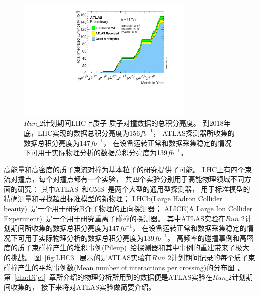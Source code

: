 \begin{figure}
  \begin{center}
    \includegraphics[width=0.75\textwidth]{figuresEXP/LHC2.pdf}
  \end{center}
  \caption{
  $Run\_2$计划期间LHC上质子-质子对撞数据的总积分亮度。
  到2018年底，LHC实现的数据总积分亮度为156$fb^{-1}$，
  ATLAS探测器所收集的数据总积分亮度为147$fb^{-1}$，
  在设备运转正常和数据采集稳定的情况下可用于实际物理分析的数据总积分亮度为139$fb^{-1}$。
  }
    \label{fig:LHC2}
\end{figure}

高能量和高密度的质子束流对撞为基本粒子的研究提供了可能。
LHC上有四个束流对撞点，每个对撞点都有一个实验，
共四个实验分别用于高能物理领域不同方面的研究：
其中ATLAS~\cite{PERF-2007-01}和CMS~\cite{CMS}是两个大型的通用型探测器，
用于标准模型的精确测量和寻找超出标准模型的新物理；
LHCb(Large Hadron Collider beauty)~\cite{LHCb}是一个用于研究B介子物理的正向探测器；
ALICE(A Large Ion Collider Experiment)~\cite{ALICE}是一个用于研究重离子碰撞的探测器。
其中ATLAS实验在$Run\_2$计划期间所收集的数据总积分亮度为147$fb^{-1}$，
在设备运转正常和数据采集稳定的情况下可用于实际物理分析的数据总积分亮度为139$fb^{-1}$。
高频率的碰撞事例和高密度的质子束碰撞产生的堆积事例(Pileup)~\cite{PileUp}给探测器和其中事例的重建带来了极大的挑战。
图~\ref{fig:LHC3}~展示的是ATLAS实验在$Run\_2$计划期间记录的每个质子束碰撞产生的平均事例数(Mean number of interactions per crossing)的分布图~\cite{ATLASWEB1}。
第~\ref{cha:Dijet}~章所介绍的物理分析所用到的数据便是ATLAS实验在$Run\_2$计划期间收集的，
接下来将对ATLAS实验做简要介绍。

